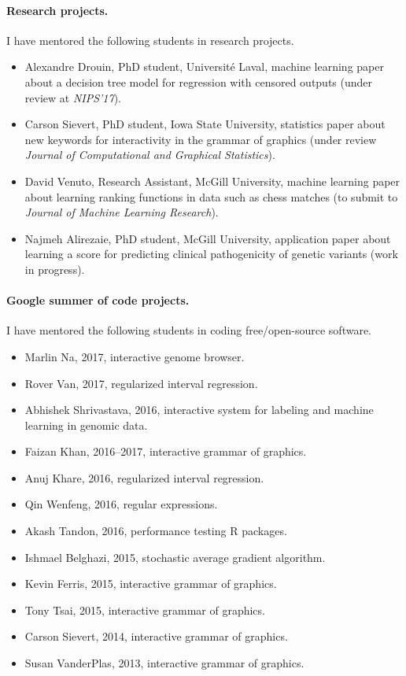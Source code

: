 \documentclass{article}
\begin{document}
\paragraph{Research projects.} I have mentored the following
students in research projects.
\begin{itemize}
\item Alexandre Drouin, PhD student, Universit\'e Laval, machine
  learning paper about a decision tree model for regression with
  censored outputs (under review at \emph{NIPS'17}).
\item Carson Sievert, PhD student, Iowa State University, statistics
  paper about new keywords for interactivity in the grammar of
  graphics (under review \emph{Journal of Computational and Graphical
    Statistics}).
\item David Venuto, Research Assistant, McGill University, machine
  learning paper about learning ranking functions in data such as
  chess matches (to submit to \emph{Journal of Machine Learning
    Research}).
\item Najmeh Alirezaie, PhD student, McGill University, application
  paper about learning a score for predicting clinical pathogenicity
  of genetic variants (work in progress).
\end{itemize}

\paragraph{Google summer of code projects.} I have mentored the
following students in coding free/open-source software.
\begin{itemize}
\item Marlin Na, 2017, interactive genome browser.
\item Rover Van, 2017, regularized interval regression.
\item Abhishek Shrivastava, 2016, interactive system for labeling and
  machine learning in genomic data.
\item Faizan Khan, 2016--2017, interactive grammar of graphics.
\item Anuj Khare, 2016, regularized interval regression.
\item Qin Wenfeng, 2016, regular expressions.
\item Akash Tandon, 2016, performance testing R packages.
\item Ishmael Belghazi, 2015, stochastic average gradient algorithm.
\item Kevin Ferris, 2015, interactive grammar of graphics.
\item Tony Tsai, 2015, interactive grammar of graphics.
\item Carson Sievert, 2014, interactive grammar of graphics.
\item Susan VanderPlas, 2013, interactive grammar of graphics.
\end{itemize}
\end{document}
